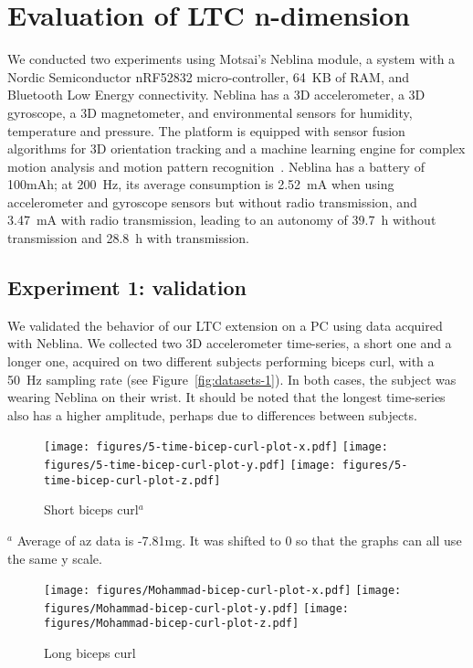 \section{Evaluation of LTC n-dimension}
\label{sec:ltc-n-dimensions}

We conducted two experiments using Motsai's Neblina
module, a system
with a Nordic Semiconductor nRF52832 micro-controller, 64~KB of RAM,
and Bluetooth Low Energy connectivity. Neblina has a 3D
accelerometer, a 3D gyroscope, a 3D magnetometer, and environmental
sensors for humidity, temperature and pressure. The platform is
equipped with sensor fusion algorithms for 3D orientation tracking and
a machine learning engine for complex motion analysis and motion
pattern recognition~\cite{sarbishei2016accuracy}. Neblina has a
battery of 100mAh; at 200~Hz, its average consumption is 2.52~mA when using
accelerometer and gyroscope sensors but without radio
transmission, and 3.47~mA with radio transmission, leading to an
autonomy of 39.7~h without transmission and 28.8~h with transmission.

\subsection{Experiment 1: validation}

We validated the behavior of our LTC extension on a PC using data
acquired with Neblina. We collected two 3D accelerometer time-series, a
short one and a longer one, acquired on two different subjects
performing biceps curl, with a 50~Hz sampling rate (see
Figure~\ref{fig:datasets-1}). In both cases, the subject was wearing
Neblina on their wrist. It should be noted that the longest
time-series also has a higher amplitude, perhaps due to differences between
subjects.

\begin{figure*}
\centering
\begin{subfigure}{\columnwidth}
\centering
\texttt{[image: figures/5-time-bicep-curl-plot-x.pdf]}
\texttt{[image: figures/5-time-bicep-curl-plot-y.pdf]}
\texttt{[image: figures/5-time-bicep-curl-plot-z.pdf]}
\caption{Short biceps curl$^a$}
\end{subfigure}

{\footnotesize $^a$ Average
of az data is -7.81mg. It was shifted to 0 so that the graphs can all
use the same y scale.}

\begin{subfigure}{\columnwidth}
\centering
\texttt{[image: figures/Mohammad-bicep-curl-plot-x.pdf]}
\texttt{[image: figures/Mohammad-bicep-curl-plot-y.pdf]}
\texttt{[image: figures/Mohammad-bicep-curl-plot-z.pdf]}
\caption{Long biceps curl}
\end{subfigure}

\caption{Time-series used in Experiment 1}
\label{fig:datasets-1}
\end{figure*}


